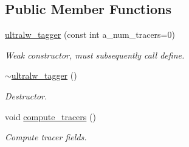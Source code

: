 \subsection*{Public Member Functions}
\begin{DoxyCompactItemize}
\item 
\hyperlink{classultralw__tagger_a34a0b2c7d905916ed62eff37d92b2a6d}{ultralw\+\_\+tagger} (const int a\+\_\+num\+\_\+tracers=0)
\begin{DoxyCompactList}\small\item\em Weak constructor, must subsequently call define. \end{DoxyCompactList}\item 
\hyperlink{classultralw__tagger_a3c4cacd0603ce2a60664b7878307917c}{$\sim$ultralw\+\_\+tagger} ()
\begin{DoxyCompactList}\small\item\em Destructor. \end{DoxyCompactList}\item 
void \hyperlink{classultralw__tagger_a82fe9b2986b96a46de5a05db97d5c5c6}{compute\+\_\+tracers} ()
\begin{DoxyCompactList}\small\item\em Compute tracer fields. \end{DoxyCompactList}\end{DoxyCompactItemize}
